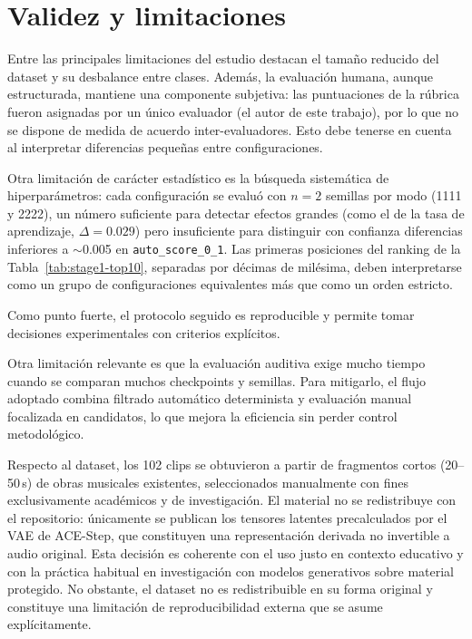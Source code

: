 \documentclass[%
    school=etsisi,%
    type=pfg,%
    degree=61CD,%
]{upm-report}
\begin{document}
\section{Validez y limitaciones}

Entre las principales limitaciones del estudio destacan el tama\~no reducido del dataset y su desbalance entre clases. Adem\'as, la evaluaci\'on humana, aunque estructurada, mantiene una componente subjetiva: las puntuaciones de la r\'ubrica fueron asignadas por un \'unico evaluador (el autor de este trabajo), por lo que no se dispone de medida de acuerdo inter-evaluadores. Esto debe tenerse en cuenta al interpretar diferencias peque\~nas entre configuraciones.

Otra limitaci\'on de car\'acter estad\'istico es la b\'usqueda sistem\'atica de hiperpar\'ametros: cada configuraci\'on se evalu\'o con $n=2$ semillas por modo (1111 y 2222), un n\'umero suficiente para detectar efectos grandes (como el de la tasa de aprendizaje, $\Delta=0.029$) pero insuficiente para distinguir con confianza diferencias inferiores a $\sim$0.005 en \texttt{auto\_score\_0\_1}. Las primeras posiciones del ranking de la Tabla~\ref{tab:stage1-top10}, separadas por d\'ecimas de mil\'esima, deben interpretarse como un grupo de configuraciones equivalentes m\'as que como un orden estricto.

Como punto fuerte, el protocolo seguido es reproducible y permite tomar decisiones experimentales con criterios expl\'icitos.

Otra limitaci\'on relevante es que la evaluaci\'on auditiva exige mucho tiempo cuando se comparan muchos checkpoints y semillas. Para mitigarlo, el flujo adoptado combina filtrado autom\'atico determinista y evaluaci\'on manual focalizada en candidatos, lo que mejora la eficiencia sin perder control metodol\'ogico.

Respecto al dataset, los 102 clips se obtuvieron a partir de fragmentos cortos (20--50\,s) de obras musicales existentes, seleccionados manualmente con fines exclusivamente acad\'emicos y de investigaci\'on. El material no se redistribuye con el repositorio: \'unicamente se publican los tensores latentes precalculados por el VAE de ACE-Step, que constituyen una representaci\'on derivada no invertible a audio original. Esta decisi\'on es coherente con el uso justo en contexto educativo y con la pr\'actica habitual en investigaci\'on con modelos generativos sobre material protegido. No obstante, el dataset no es redistribuible en su forma original y constituye una limitaci\'on de reproducibilidad externa que se asume expl\'icitamente.
\end{document}
